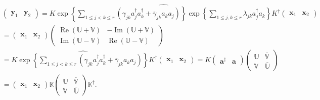 \documentclass[aps, preprint]{revtex4}
\begin{document}
\begin{align} & \left (\begin{array}{cc}\mathbf{y}_{1} & \mathbf{y}_{2}\end{array}\right ) =K \widehat{\exp  \left \{\sum _{1 \leq j <k \leq r}\left (\gamma _{j k} a_{j}^{ \dag } a_{k}^{ \dag } +\overline{\gamma }_{j k} a_{k} a_{j}\right )\right \} \exp  \left \{\sum _{1 \leq j ,k \leq r}\lambda _{j k} a_{j}^{ \dag } a_{k}\right \}} K^{ \dag } \left (\begin{array}{cc}\mathbf{x}_{1} & \mathbf{x}_{2}\end{array}\right ) \\
 &  =\left (\begin{array}{cc}\mathbf{x}_{1} & \mathbf{x}_{2}\end{array}\right ) \left (\begin{array}{cc}\ensuremath{\operatorname*{Re}} \left (\mathbb{U} +\mathbb{V}\right ) &  -\ensuremath{\operatorname*{Im}} \left (\mathbb{U} +\mathbb{V}\right ) \\
\ensuremath{\operatorname*{Im}} \left (\mathbb{U} -\mathbb{V}\right ) & \ensuremath{\operatorname*{Re}} \left (\mathbb{U} -\mathbb{V}\right )\end{array}\right ) \\
 &  =K \widehat{\exp  \left \{\sum _{1 \leq j <k \leq r}\left (\gamma _{j k} a_{j}^{ \dag } a_{k}^{ \dag } +\overline{\gamma }_{j k} a_{k} a_{j}\right )\right \}} K^{ \dag } \left (\begin{array}{cc}\mathbf{x}_{1} & \mathbf{x}_{2}\end{array}\right ) =K \left (\begin{array}{cc}\mathbf{a}^{ \dag } & \mathbf{a}\end{array}\right ) \left (\begin{array}{cc}\mathbb{U} & \overline{\mathbb{V}} \\
\mathbb{V} & \overline{\mathbb{U}}\end{array}\right ) \\
 &  =\left (\begin{array}{cc}\mathbf{x}_{1} & \mathbf{x}_{2}\end{array}\right ) \mathbb{K} \left (\begin{array}{cc}\mathbb{U} & \overline{\mathbb{V}} \\
\mathbb{V} & \overline{\mathbb{U}}\end{array}\right ) \mathbb{K}^{ \dag }\text{.}\end{align}
\end{document}
